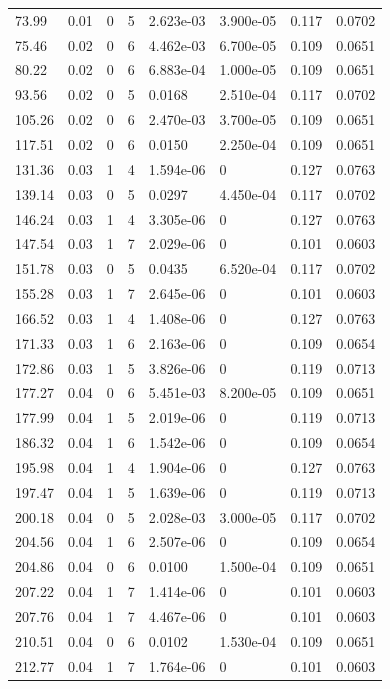 \documentclass[preview]{standalone}
\begin{document}
{{\begin{tabular}{L{1.2cm}C{1.2cm} C{0.3cm}C{0.5cm} C{1.4cm}C{1.4cm} C{1.4cm}C{1.4cm}}
  73.99  &  0.01  & 0     &  5 &  2.623e-03  & 3.900e-05  & 0.117 &  0.0702   \\ 
  75.46  &  0.02  & 0     &  6 &  4.462e-03  & 6.700e-05  & 0.109 &  0.0651   \\ 
  80.22  &  0.02  & 0     &  6 &  6.883e-04  & 1.000e-05  & 0.109 &  0.0651   \\ 
  93.56  &  0.02  & 0     &  5 &  0.0168  & 2.510e-04  & 0.117 &  0.0702   \\ 
  105.26  &  0.02  & 0     &  6 &  2.470e-03  & 3.700e-05  & 0.109 &  0.0651   \\ 
  117.51  &  0.02  & 0     &  6 &  0.0150  & 2.250e-04  & 0.109 &  0.0651   \\ 
  131.36  &  0.03  & 1     &  4 &  1.594e-06  & 0  & 0.127 &  0.0763   \\ 
  139.14  &  0.03  & 0     &  5 &  0.0297  & 4.450e-04  & 0.117 &  0.0702   \\ 
  146.24  &  0.03  & 1     &  4 &  3.305e-06  & 0  & 0.127 &  0.0763   \\ 
  147.54  &  0.03  & 1     &  7 &  2.029e-06  & 0  & 0.101 &  0.0603   \\ 
  151.78  &  0.03  & 0     &  5 &  0.0435  & 6.520e-04  & 0.117 &  0.0702   \\ 
  155.28  &  0.03  & 1     &  7 &  2.645e-06  & 0  & 0.101 &  0.0603   \\ 
  166.52  &  0.03  & 1     &  4 &  1.408e-06  & 0  & 0.127 &  0.0763   \\ 
  171.33  &  0.03  & 1     &  6 &  2.163e-06  & 0  & 0.109 &  0.0654   \\ 
  172.86  &  0.03  & 1     &  5 &  3.826e-06  & 0  & 0.119 &  0.0713   \\ 
  177.27  &  0.04  & 0     &  6 &  5.451e-03  & 8.200e-05  & 0.109 &  0.0651   \\ 
  177.99  &  0.04  & 1     &  5 &  2.019e-06  & 0  & 0.119 &  0.0713   \\ 
  186.32  &  0.04  & 1     &  6 &  1.542e-06  & 0  & 0.109 &  0.0654   \\ 
  195.98  &  0.04  & 1     &  4 &  1.904e-06  & 0  & 0.127 &  0.0763   \\ 
  197.47  &  0.04  & 1     &  5 &  1.639e-06  & 0  & 0.119 &  0.0713   \\ 
  200.18  &  0.04  & 0     &  5 &  2.028e-03  & 3.000e-05  & 0.117 &  0.0702   \\ 
  204.56  &  0.04  & 1     &  6 &  2.507e-06  & 0  & 0.109 &  0.0654   \\ 
  204.86  &  0.04  & 0     &  6 &  0.0100  & 1.500e-04  & 0.109 &  0.0651   \\ 
  207.22  &  0.04  & 1     &  7 &  1.414e-06  & 0  & 0.101 &  0.0603   \\ 
  207.76  &  0.04  & 1     &  7 &  4.467e-06  & 0  & 0.101 &  0.0603   \\ 
  210.51  &  0.04  & 0     &  6 &  0.0102  & 1.530e-04  & 0.109 &  0.0651   \\ 
  212.77  &  0.04  & 1     &  7 &  1.764e-06  & 0  & 0.101 &  0.0603   \\ 
\hline 
\end{tabular} 

}}
\end{document}
